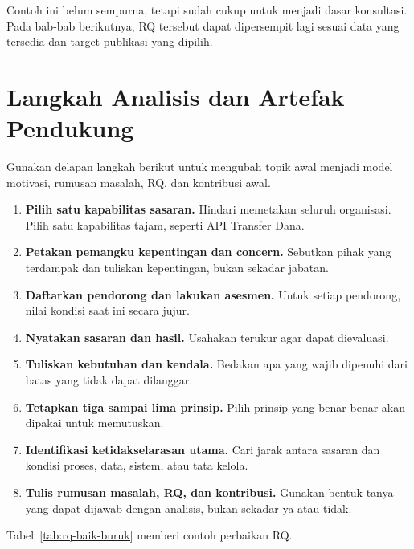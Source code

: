 Contoh ini belum sempurna, tetapi sudah cukup untuk menjadi dasar konsultasi.
Pada bab-bab berikutnya, RQ tersebut dapat dipersempit lagi sesuai data yang
tersedia dan target publikasi yang dipilih.

\section{Langkah Analisis dan Artefak Pendukung}

Gunakan delapan langkah berikut untuk mengubah topik awal menjadi model
motivasi, rumusan masalah, RQ, dan kontribusi awal.

\begin{enumerate}
  \item \textbf{Pilih satu kapabilitas sasaran.} Hindari memetakan seluruh
        organisasi. Pilih satu kapabilitas tajam, seperti API Transfer Dana.
  \item \textbf{Petakan pemangku kepentingan dan concern.} Sebutkan pihak yang
        terdampak dan tuliskan kepentingan, bukan sekadar jabatan.
  \item \textbf{Daftarkan pendorong dan lakukan asesmen.} Untuk setiap
        pendorong, nilai kondisi saat ini secara jujur.
  \item \textbf{Nyatakan sasaran dan hasil.} Usahakan terukur agar dapat
        dievaluasi.
  \item \textbf{Tuliskan kebutuhan dan kendala.} Bedakan apa yang wajib dipenuhi
        dari batas yang tidak dapat dilanggar.
  \item \textbf{Tetapkan tiga sampai lima prinsip.} Pilih prinsip yang benar-benar
        akan dipakai untuk memutuskan.
  \item \textbf{Identifikasi ketidakselarasan utama.} Cari jarak antara sasaran
        dan kondisi proses, data, sistem, atau tata kelola.
  \item \textbf{Tulis rumusan masalah, RQ, dan kontribusi.} Gunakan bentuk tanya
        yang dapat dijawab dengan analisis, bukan sekadar ya atau tidak.
\end{enumerate}

Tabel~\ref{tab:rq-baik-buruk} memberi contoh perbaikan RQ.

